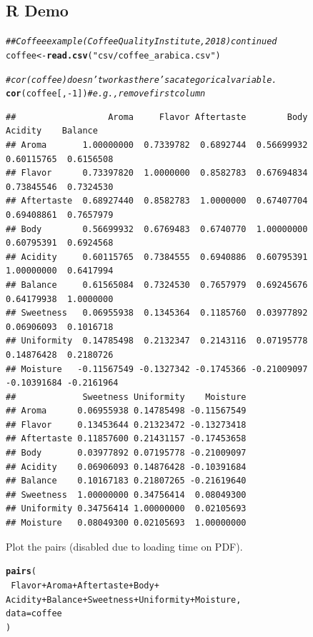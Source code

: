 \documentclass[oneside]{book}\usepackage[]{graphicx}\usepackage[dvipsnames,table,xcdraw]{xcolor}
\makeatletter
\newcommand{\hlnum}[1]{\textcolor[rgb]{0.686,0.059,0.569}{#1}}%
\newcommand{\hlstr}[1]{\textcolor[rgb]{0.192,0.494,0.8}{#1}}%
\newcommand{\hlcom}[1]{\textcolor[rgb]{0.678,0.584,0.686}{\textit{#1}}}%
\newcommand{\hlopt}[1]{\textcolor[rgb]{0,0,0}{#1}}%
\newcommand{\hlstd}[1]{\textcolor[rgb]{0.345,0.345,0.345}{#1}}%
\newcommand{\hlkwb}[1]{\textcolor[rgb]{0.69,0.353,0.396}{#1}}%
\newcommand{\hlkwc}[1]{\textcolor[rgb]{0.333,0.667,0.333}{#1}}%
\newcommand{\hlkwd}[1]{\textcolor[rgb]{0.737,0.353,0.396}{\textbf{#1}}}%
\newenvironment{kframe}{%
 \def\at@end@of@kframe{}%
 \ifinner\ifhmode%
  \def\at@end@of@kframe{\end{minipage}}%
  \begin{minipage}{\columnwidth}%
 \fi\fi%
 \def\FrameCommand##1{\hskip\@totalleftmargin \hskip-\fboxsep
 \colorbox{shadecolor}{##1}\hskip-\fboxsep
     \hskip-\linewidth \hskip-\@totalleftmargin \hskip\columnwidth}%
 \MakeFramed {\advance\hsize-\width
   \@totalleftmargin\z@ \linewidth\hsize
   \@setminipage}}%
 {\par\unskip\endMakeFramed%
 \at@end@of@kframe}
\newenvironment{knitrout}{}{} %
\makeatother
\begin{document}
\subsection{R Demo}
\begin{knitrout}
\color{fgcolor}\begin{kframe}
\begin{alltt}
\hlcom{## Coffee example (Coffee Quality Institute, 2018) continued}
\hlstd{coffee} \hlkwb{<-} \hlkwd{read.csv}\hlstd{(}\hlstr{"csv/coffee_arabica.csv"}\hlstd{)}

\hlcom{# cor(coffee) doesn't work as there's a categorical variable.}
\hlkwd{cor}\hlstd{(coffee[,} \hlopt{-}\hlnum{1}\hlstd{])} \hlcom{# e.g., remove first column}
\end{alltt}
\begin{verbatim}
##                  Aroma     Flavor Aftertaste        Body     Acidity    Balance
## Aroma       1.00000000  0.7339782  0.6892744  0.56699932  0.60115765  0.6156508
## Flavor      0.73397820  1.0000000  0.8582783  0.67694834  0.73845546  0.7324530
## Aftertaste  0.68927440  0.8582783  1.0000000  0.67407704  0.69408861  0.7657979
## Body        0.56699932  0.6769483  0.6740770  1.00000000  0.60795391  0.6924568
## Acidity     0.60115765  0.7384555  0.6940886  0.60795391  1.00000000  0.6417994
## Balance     0.61565084  0.7324530  0.7657979  0.69245676  0.64179938  1.0000000
## Sweetness   0.06955938  0.1345364  0.1185760  0.03977892  0.06906093  0.1016718
## Uniformity  0.14785498  0.2132347  0.2143116  0.07195778  0.14876428  0.2180726
## Moisture   -0.11567549 -0.1327342 -0.1745366 -0.21009097 -0.10391684 -0.2161964
##             Sweetness Uniformity    Moisture
## Aroma      0.06955938 0.14785498 -0.11567549
## Flavor     0.13453644 0.21323472 -0.13273418
## Aftertaste 0.11857600 0.21431157 -0.17453658
## Body       0.03977892 0.07195778 -0.21009097
## Acidity    0.06906093 0.14876428 -0.10391684
## Balance    0.10167183 0.21807265 -0.21619640
## Sweetness  1.00000000 0.34756414  0.08049300
## Uniformity 0.34756414 1.00000000  0.02105693
## Moisture   0.08049300 0.02105693  1.00000000
\end{verbatim}
\end{kframe}
\end{knitrout}

Plot the pairs (disabled due to loading time on PDF).

\begin{knitrout}
\color{fgcolor}\begin{kframe}
\begin{alltt}
\hlkwd{pairs}\hlstd{(}
\hlopt{~} \hlstd{Flavor} \hlopt{+} \hlstd{Aroma} \hlopt{+} \hlstd{Aftertaste} \hlopt{+} \hlstd{Body} \hlopt{+}
\hlstd{Acidity} \hlopt{+} \hlstd{Balance} \hlopt{+} \hlstd{Sweetness} \hlopt{+} \hlstd{Uniformity} \hlopt{+} \hlstd{Moisture,}
\hlkwc{data} \hlstd{= coffee}
\hlstd{)}
\end{alltt}
\end{kframe}
\end{knitrout}
\end{document}
